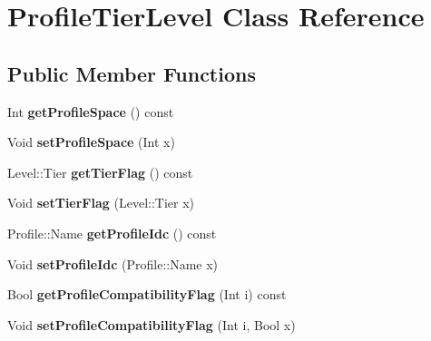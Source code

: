 \hypertarget{class_profile_tier_level}{}\section{Profile\+Tier\+Level Class Reference}
\label{class_profile_tier_level}
\subsection*{Public Member Functions}
\begin{DoxyCompactItemize}
\item 
\mbox{\label{class_profile_tier_level_aa0201129cbc97194126feb538b8b3fbe}} 
Int {\bfseries get\+Profile\+Space} () const
\item 
\mbox{\label{class_profile_tier_level_a7ea376109af558f37626958fba18adb4}} 
Void {\bfseries set\+Profile\+Space} (Int x)
\item 
\mbox{\label{class_profile_tier_level_a1b0cdb43cb590a89a2f23f288a404e37}} 
Level\+::\+Tier {\bfseries get\+Tier\+Flag} () const
\item 
\mbox{\label{class_profile_tier_level_ae9d355905d3dd88c306bb9b7d96d93f7}} 
Void {\bfseries set\+Tier\+Flag} (Level\+::\+Tier x)
\item 
\mbox{\label{class_profile_tier_level_a5975e8b4056dd6f484e4bb28d1f8d1c0}} 
Profile\+::\+Name {\bfseries get\+Profile\+Idc} () const
\item 
\mbox{\label{class_profile_tier_level_a49f2de3e995db16597934f914766305f}} 
Void {\bfseries set\+Profile\+Idc} (Profile\+::\+Name x)
\item 
\mbox{\label{class_profile_tier_level_aa54c6787ee588abf7770143aa7400e00}} 
Bool {\bfseries get\+Profile\+Compatibility\+Flag} (Int i) const
\item 
\mbox{\label{class_profile_tier_level_af84e22f38e23e842d66e38aa5a74c528}} 
Void {\bfseries set\+Profile\+Compatibility\+Flag} (Int i, Bool x)
\item 

\end{DoxyCompactItemize}
